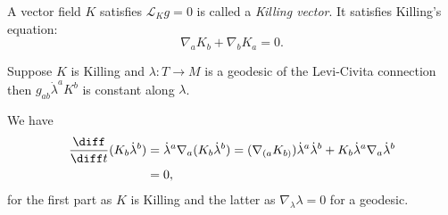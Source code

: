 \documentclass[12pt]{article}
\begin{document}
\begin{definition}
	A vector field $K$ satisfies $\mathcal{L}_K g = 0$ is called a \emph{Killing vector}. It satisfies Killing's equation:
	\[
	\nabla_a K_b + \nabla_b K_a = 0.
	\]
\end{definition}

\begin{lemma}
	Suppose $K$ is Killing and $\lambda : T \to M$ is a geodesic of the Levi-Civita connection then $g_{ab} \dot \lambda ^a K^b$ is constant along $\lambda$.
\end{lemma}

\begin{proofbox}
	We have
	\begin{align*}
		\frac{\diff}{\diff t} (K_b \dot \lambda^b) &= \dot \lambda^a \nabla_a (K_b \dot \lambda^b) = (\nabla_{(a}K_{b)}) \dot \lambda^a \dot \lambda^b + K_b \dot \lambda^a \nabla_a \dot \lambda^b \\
							   &= 0,
	\end{align*}
	for the first part as $K$ is Killing and the latter as $\nabla_\lambda \lambda = 0$ for a geodesic.
\end{proofbox}



\newpage

\printindex
\end{document}
